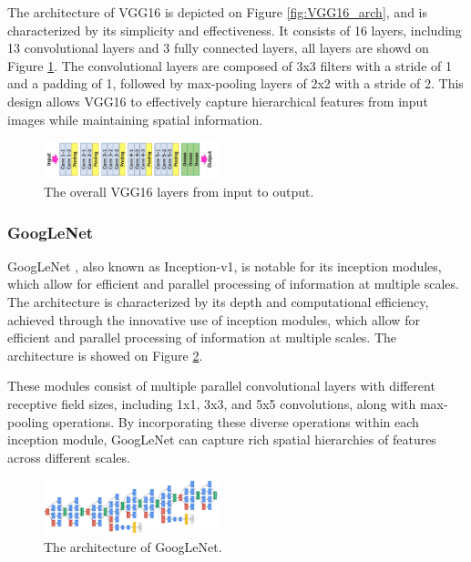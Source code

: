\documentclass[final,5p,times,twocolumn,sort&compress]{elsarticle}
\begin{document}
The architecture of VGG16 \cite{simonyan2015deep} is depicted on Figure \ref{fig:VGG16_arch}, and is characterized by its simplicity and effectiveness. It consists of 16 layers, including 13 convolutional layers and 3 fully connected layers, all layers are showd on Figure \ref{fig:VGG16_layers}. The convolutional layers are composed of 3x3 filters with a stride of 1 and a padding of 1, followed by max-pooling layers of 2x2 with a stride of 2. This design allows VGG16 to effectively capture hierarchical features from input images while maintaining spatial information.

\begin{figure}[H]
    \centering
    \includegraphics[width=0.45\textwidth]{./img/VGG_layers.jpg}
    \caption{The overall VGG16 layers from input to output.}
    \label{fig:VGG16_layers}
\end{figure}

\subsubsection{GoogLeNet}
GoogLeNet \cite{7298594}, also known as Inception-v1, is notable for its inception modules, which allow for efficient and parallel processing of information at multiple scales. The architecture is characterized by its depth and computational efficiency, achieved through the innovative use of inception modules, which allow for efficient and parallel processing of information at multiple scales. The architecture is showed on Figure \ref{fig:GoogLeNet_arch}.

These modules consist of multiple parallel convolutional layers with different receptive field sizes, including 1x1, 3x3, and 5x5 convolutions, along with max-pooling operations. By incorporating these diverse operations within each inception module, GoogLeNet can capture rich spatial hierarchies of features across different scales.

\begin{figure}[H]
    \centering
    \includegraphics[width=0.45\textwidth]{./img/GoogleNet_arch.png}
    \caption{The architecture of GoogLeNet.}
    \label{fig:GoogLeNet_arch}
\end{figure}
\end{document}
